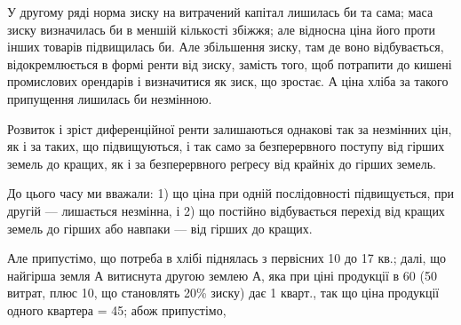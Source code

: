 У другому ряді норма зиску на витрачений капітал лишилась би та
сама; маса зиску визначилась би в меншій кількості збіжжя; але відносна ціна
його проти інших товарів підвищилась би. Але збільшення зиску, там де воно
відбувається, відокремлюється в формі ренти від зиску, замість того, щоб потрапити
до кишені промислових орендарів і визначитися як зиск, що зростає.
А ціна хліба за такого припущення лишилась би незмінною.

Розвиток і зріст диференційної ренти залишаються однакові так за незмінних
цін, як і за таких, що підвищуються, і так само за безперервного поступу
від гірших земель до кращих, як і за безперервного реґресу від крайніх
до гірших земель.

До цього часу ми вважали: 1) що ціна при одній послідовності підвищується,
при другій — лишається незмінна, і 2) що постійно відбувається перехід
від кращих земель до гірших або навпаки — від гірших до кращих.

Але припустімо, що потреба в хлібі піднялась з первісних 10 до 17 кв.;
далі, що найгірша земля А витиснута другою землею А, яка при ціні продукції
в 60 (50 витрат, плюс 10, що становлять 20\% зиску) дає
1 кварт., так що ціна продукції одного квартера = 45; абож припустімо,
\parbreak{}  %
